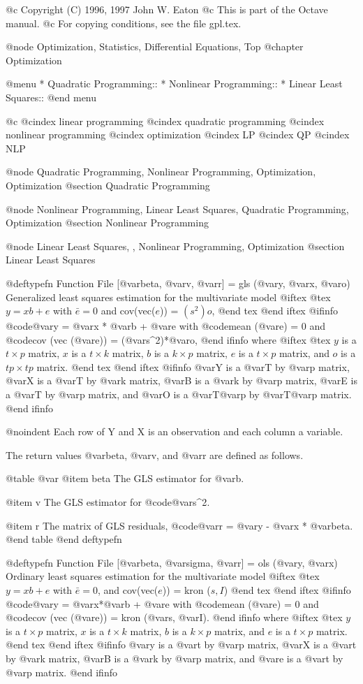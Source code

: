@c Copyright (C) 1996, 1997 John W. Eaton
@c This is part of the Octave manual.
@c For copying conditions, see the file gpl.tex.

@node Optimization, Statistics, Differential Equations, Top
@chapter Optimization

@menu
* Quadratic Programming::       
* Nonlinear Programming::       
* Linear Least Squares::        
@end menu

@c @cindex linear programming
@cindex quadratic programming
@cindex nonlinear programming
@cindex optimization
@cindex LP
@cindex QP
@cindex NLP

@node Quadratic Programming, Nonlinear Programming, Optimization, Optimization
@section Quadratic Programming

@node Nonlinear Programming, Linear Least Squares, Quadratic Programming, Optimization
@section Nonlinear Programming

@node Linear Least Squares,  , Nonlinear Programming, Optimization
@section Linear Least Squares

@deftypefn {Function File} {[@var{beta}, @var{v}, @var{r}] =} gls (@var{y}, @var{x}, @var{o})
Generalized least squares estimation for the multivariate model
@iftex
@tex
$y = x b + e$
with $\bar{e} = 0$ and cov(vec($e$)) = $(s^2)o$,
@end tex
@end iftex
@ifinfo
@code{@var{y} = @var{x} * @var{b} + @var{e}} with @code{mean (@var{e}) =
0} and @code{cov (vec (@var{e})) = (@var{s}^2)*@var{o}},
@end ifinfo
 where
@iftex
@tex 
$y$ is a $t \times p$ matrix, $x$ is a $t \times k$ matrix, $b$ is a $k
\times p$ matrix, $e$ is a $t \times p$ matrix, and $o$ is a $tp \times
tp$ matrix.
@end tex
@end iftex
@ifinfo
@var{Y} is a @var{T} by @var{p} matrix, @var{X} is a @var{T} by @var{k}
matrix, @var{B} is a @var{k} by @var{p} matrix, @var{E} is a @var{T} by
@var{p} matrix, and @var{O} is a @var{T}@var{p} by @var{T}@var{p}
matrix.
@end ifinfo

@noindent
Each row of Y and X is an observation and each column a variable.

The return values @var{beta}, @var{v}, and @var{r} are defined as
follows.

@table @var
@item beta
The GLS estimator for @var{b}.

@item v
The GLS estimator for @code{@var{s}^2}.

@item r
The matrix of GLS residuals, @code{@var{r} = @var{y} - @var{x} *
@var{beta}}.
@end table
@end deftypefn

@deftypefn {Function File} {[@var{beta}, @var{sigma}, @var{r}] =} ols (@var{y}, @var{x})
Ordinary least squares estimation for the multivariate model
@iftex
@tex
$y = x b + e$
with
$\bar{e} = 0$, and cov(vec($e$)) = kron ($s, I$)
@end tex
@end iftex
@ifinfo
@code{@var{y} = @var{x}*@var{b} + @var{e}} with
@code{mean (@var{e}) = 0} and @code{cov (vec (@var{e})) = kron (@var{s},
@var{I})}.
@end ifinfo
 where
@iftex
@tex
$y$ is a $t \times p$ matrix, $x$ is a $t \times k$ matrix, 
$b$ is a $k \times p$ matrix, and $e$ is a $t \times p$ matrix.
@end tex
@end iftex
@ifinfo
@var{y} is a @var{t} by @var{p} matrix, @var{X} is a @var{t} by @var{k}
matrix, @var{B} is a @var{k} by @var{p} matrix, and @var{e} is a @var{t}
by @var{p} matrix.
@end ifinfo

